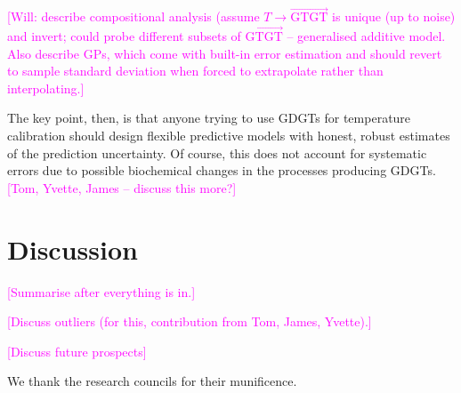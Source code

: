 \documentclass[rmp,aps,twocolumn]{revtex4-1}
\newcommand{\ilya}[1]{\textcolor{magenta}{#1}}
\begin{document}
\ilya{[Will: describe compositional analysis (assume $T \to \vec{\mathrm{GTGT}}$ is unique (up to noise) and invert; could probe different subsets of $\vec{\mathrm{GTGT}}$ -- generalised additive model.  Also describe GPs, which come with built-in error estimation and should revert to sample standard deviation when forced to extrapolate rather than interpolating.]}

The key point, then, is that anyone trying to use GDGTs for temperature calibration should design flexible predictive models with honest, robust estimates of the prediction uncertainty.  Of course, this does not account for systematic errors due to possible biochemical changes in the processes producing GDGTs. \ilya{[Tom, Yvette, James -- discuss this more?]}

\section{Discussion}\label{sec:discussion}

\ilya{[Summarise after everything is in.]}

\ilya{[Discuss outliers (for this, contribution from Tom, James, Yvette).]}

\ilya{[Discuss future prospects]}


\begin{acknowledgements}
We thank the research councils for their munificence.

\end{acknowledgements}



\end{document}

